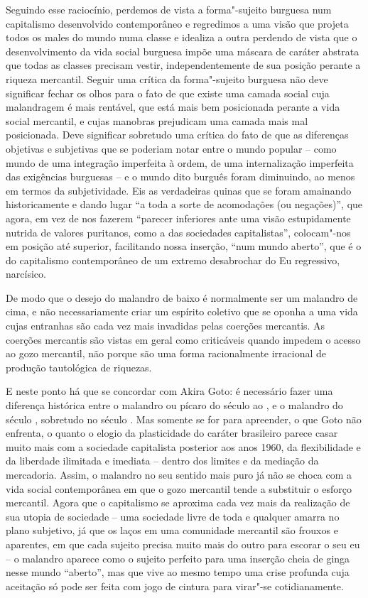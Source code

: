 Seguindo esse raciocínio, perdemos de vista a forma"-sujeito burguesa num
capitalismo desenvolvido contemporâneo e regredimos a uma visão que
projeta todos os males do mundo numa classe e idealiza a outra perdendo
de vista que o desenvolvimento da vida social burguesa impõe uma máscara
de caráter abstrata que todas as classes precisam vestir,
independentemente de sua posição perante a riqueza mercantil. Seguir uma
crítica da forma"-sujeito burguesa não deve significar fechar os olhos
para o fato de que existe uma camada social cuja malandragem é mais
rentável, que está mais bem posicionada perante a vida social mercantil,
e cujas manobras prejudicam uma camada mais mal posicionada. Deve
significar sobretudo uma crítica do fato de que as diferenças objetivas
e subjetivas que se poderiam notar entre o mundo popular -- como mundo
de uma integração imperfeita à ordem, de uma internalização imperfeita
das exigências burguesas -- e o mundo dito burguês foram diminuindo, ao
menos em termos da subjetividade. Eis as verdadeiras quinas que se foram
amainando historicamente e dando lugar ``a toda a sorte de acomodações
(ou negações)'', que agora, em vez de nos fazerem ``parecer inferiores
ante uma visão estupidamente nutrida de valores puritanos, como a das
sociedades capitalistas'', colocam"-nos em posição até superior,
facilitando nossa inserção, ``num mundo aberto'', que é o do capitalismo
contemporâneo de um extremo desabrochar do Eu regressivo, narcísico.

De modo que o desejo do malandro de baixo é normalmente ser um malandro
de cima, e não necessariamente criar um espírito coletivo que se oponha
a uma vida cujas entranhas são cada vez mais invadidas pelas coerções
mercantis. As coerções mercantis são vistas em geral como criticáveis
quando impedem o acesso ao gozo mercantil, não porque são uma forma
racionalmente irracional de produção tautológica de riquezas.

E neste ponto há que se concordar com Akira Goto: é necessário fazer uma
diferença histórica entre o malandro ou pícaro do século  ao , e o
malandro do século , sobretudo no século . Mas somente se for para
apreender, o que Goto não enfrenta, o quanto o elogio da plasticidade do
caráter brasileiro parece casar muito mais com a sociedade capitalista
posterior aos anos 1960, da flexibilidade e da liberdade ilimitada e
imediata -- dentro dos limites e da mediação da mercadoria. Assim, o
malandro no seu sentido mais puro já não se choca com a vida social
contemporânea em que o gozo mercantil tende a substituir o esforço
mercantil. Agora que o capitalismo se aproxima cada vez mais da
realização de sua utopia de sociedade -- uma sociedade livre de toda e
qualquer amarra no plano subjetivo, já que os laços em uma comunidade
mercantil são frouxos e aparentes, em que cada sujeito precisa muito
mais do outro para escorar o seu eu -- o malandro aparece como o sujeito
perfeito para uma inserção cheia de ginga nesse mundo ``aberto'', mas
que vive ao mesmo tempo uma crise profunda cuja aceitação só pode ser
feita com jogo de cintura para virar"-se cotidianamente.

